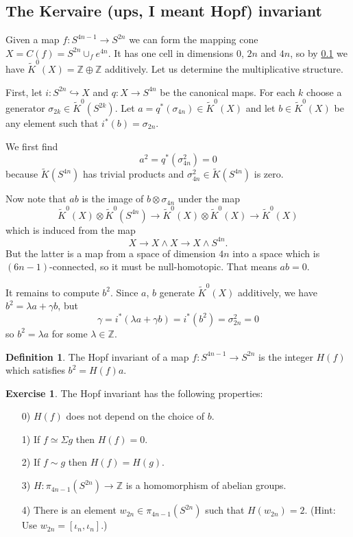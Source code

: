 \documentclass[a4paper,10pt]{article}
\theoremstyle{plain}%
\theoremstyle{definition}
\newtheorem{defn}{Definition}
\newtheorem{exer}{Exercise}
\theoremstyle{remark}
\newcommand{\ZZ}{\mathbb{Z}}
\newcommand{\KR}{\widetilde{K}}   %
\newcommand{\smsh}{\wedge}  %
\newcommand{\susp}{\Sigma}  %
\newcommand{\htpyequiv}{\simeq}  %
\newcommand{\htpic}{\sim}  %
\begin{document}
\subsection{The Kervaire (ups, I meant Hopf) invariant}
Given a map $f:S^{4n-1}\to S^{2n}$ we can form the mapping cone $X=C(f)=S^{2n}\cup_f e^{4n}$. It has one cell in dimensions $0$, $2n$ and $4n$, so by \ref{}  we have $\KR^0(X)=\ZZ\oplus\ZZ$ additively. Let us determine the multiplicative structure.

First, let $i:S^{2n}\hookrightarrow X$ and $q:X\to S^{4n}$ be the canonical maps. For each $k$ choose a generator $\sigma_{2k}\in \KR^0(S^{2k})$. Let $a=q^*(\sigma_{4n})\in\KR^0(X)$ and let $b\in\KR^0(X)$ be any element such that $i^*(b)=\sigma_{2n}$.

We first find
$$a^2=q^*(\sigma_{4n}^2)=0$$
because $\KR(S^{4n})$ has trivial products and $\sigma_{4n}^2\in \KR(S^{4n})$ is zero.

Now note that $ab$ is the image of $b\otimes \sigma_{4n}$ under the map
$$\KR^0(X)\otimes \KR^0(S^{4n})\to \KR^0(X)\otimes \KR^0(X) \to \KR^0(X)$$
which is induced from the map
$$X\to X\smsh X\to X\smsh S^{4n}.$$
But the latter is a map from a space of dimension $4n$ into a space which is $(6n-1)$-connected, so it must be null-homotopic. That means $ab=0$.

It remains to compute $b^2$. Since $a$, $b$ generate $\KR^0(X)$ additively, we have $b^2=\lambda a+\gamma b$, but
$$\gamma=i^*(\lambda a+\gamma b)=i^*(b^2)=\sigma_{2n}^2=0$$
so $b^2=\lambda a$ for some $\lambda\in\ZZ$.

\begin{defn}
The Hopf invariant of a map $f:S^{4n-1}\to S^{2n}$ is the integer $H(f)$ which satisfies $b^2=H(f)a$.
\end{defn}

\begin{exer}
The Hopf invariant has the following properties:
\begin{itemize}
\item[0)] $H(f)$ does not depend on the choice of $b$.
\item[1)] If $f\htpyequiv \susp g$ then $H(f)=0$.
\item[2)] If $f\htpic g$ then $H(f)=H(g)$.
\item[3)] $H:\pi_{4n-1}(S^{2n})\to \ZZ$ is a homomorphism of abelian groups.
\item[4)] There is an element $w_{2n}\in \pi_{4n-1}(S^{2n})$ such that $H(w_{2n})=2$. (Hint: Use $w_{2n}=[\iota_n,\iota_n]$.)
\end{itemize}
\end{exer}
\end{document}
